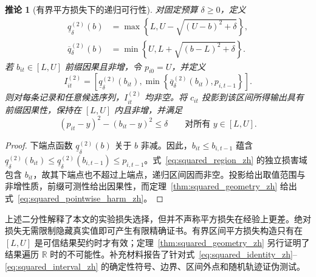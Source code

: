 \documentclass[UTF8,11pt]{ctexart}
\newtheorem{corollary}{推论}
\newcommand{\R}{\mathbb{R}}
\begin{document}
\begin{corollary}[有界平方损失下的递归可行性]
\label{cor:squared_recursive_zh}
对固定预算 $\delta\geq0$，定义
\begin{align}
  \underline q^{(2)}_{\delta}(b)
  &=\max\!\left\{L,U-\sqrt{(U-b)^2+\delta}\right\},\\
  \overline q^{(2)}_{\delta}(b)
  &=\min\!\left\{U,L+\sqrt{(b-L)^2+\delta}\right\}.
  \label{eq:squared_bounds_zh}
\end{align}
若 $b_{it}\in[L,U]$ 前缀因果且非增，令 $p_{i0}=U$，并定义
\begin{equation}
  I^{(2)}_{it}
  =\left[
  \underline q^{(2)}_{\delta}(b_{it}),
  \min\!\left\{\overline q^{(2)}_{\delta}(b_{it}),p_{i,t-1}\right\}
  \right].
  \label{eq:squared_interval_zh}
\end{equation}
则对每条记录和任意候选序列，$I^{(2)}_{it}$ 均非空。将 $c_{it}$ 投影到该区间所得输出具有前缀因果性，保持在 $[L,U]$ 内且非增，并满足
\begin{equation}
  (p_{it}-y)^2-(b_{it}-y)^2\leq\delta
  \qquad\text{对所有 }y\in[L,U].
  \label{eq:squared_pointwise_harm_zh}
\end{equation}
\end{corollary}
\begin{proof}
下端点函数 $\underline q^{(2)}_{\delta}(b)$ 关于 $b$ 非减。因此，$b_{it}\leq b_{i,t-1}$ 蕴含 $\underline q^{(2)}_{\delta}(b_{it})\leq\underline q^{(2)}_{\delta}(b_{i,t-1})\leq p_{i,t-1}$。式~\eqref{eq:squared_region_zh} 的独立损害域包含 $b_{it}$，故其下端点也不超过上端点，递归区间因而非空。投影给出取值范围与非增性质，前缀可测性给出因果性，而定理~\ref{thm:squared_geometry_zh} 给出式~\eqref{eq:squared_pointwise_harm_zh}。
\end{proof}

上述二分性解释了本文的实验损失选择，但并不声称平方损失在经验上更差。绝对损失无需限制隐藏真实值即可产生有限精确证书。有界区间平方损失构造只有在 $[L,U]$ 是可信结果契约时才有效；定理~\ref{thm:squared_geometry_zh} 另行证明了结果遍历 $\R$ 时的不可能性。补充材料报告了针对式~\eqref{eq:squared_identity_zh}--\eqref{eq:squared_interval_zh} 的确定性符号、边界、区间外点和随机轨迹证伪测试。
\end{document}
